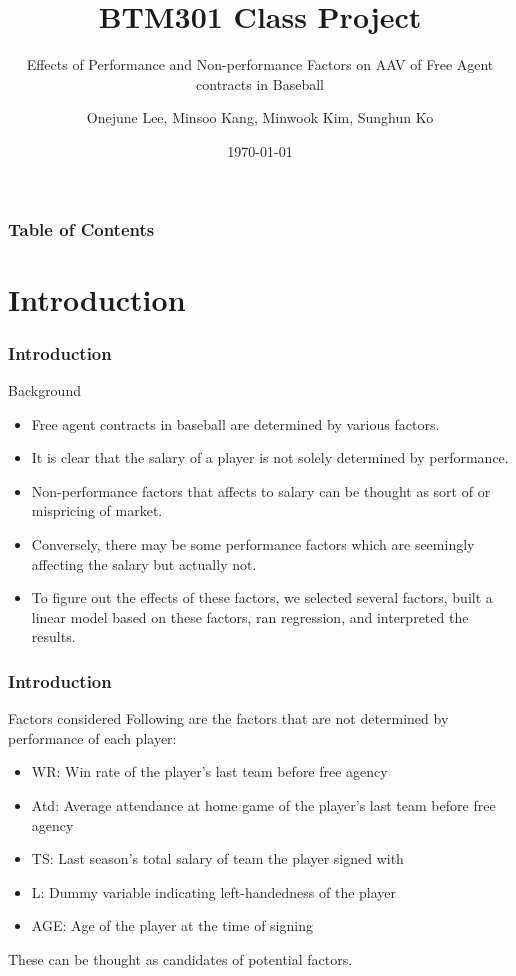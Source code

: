 \documentclass[9pt]{beamer}
\subtitle{Effects of Performance and Non-performance Factors on AAV of Free Agent contracts in Baseball}
\title{BTM301 Class Project}
\author[Team 1]{
    Onejune Lee,
    Minsoo Kang,
    Minwook Kim,
    Sunghun Ko
}
\institute{KAIST}
\date{\today}
\begin{document}
\begin{frame}
    \titlepage
\end{frame}
\begin{frame}
    \frametitle{Table of Contents}
    \tableofcontents
\end{frame}

\section{Introduction}
\begin{frame}
    \frametitle{Introduction}
    \begin{block}{Background}
        \begin{itemize}
            \item Free agent contracts in baseball are determined by various factors.
            \item It is clear that the salary of a player is not solely determined by performance.
            \item Non-performance factors that affects to salary can be thought as sort of  or mispricing of market.
            \item Conversely, there may be some performance factors which are seemingly affecting the salary but actually not.
            \item To figure out the effects of these factors, we selected several factors, built a linear model based on these factors, ran regression, and interpreted the results.
        \end{itemize}
    \end{block}
\end{frame}
\begin{frame}
    \frametitle{Introduction}
    \begin{block}{Factors considered}
        Following are the factors that are not determined by performance of each player:
        \begin{itemize}
            \item WR: Win rate of the player's last team before free agency
            \item Atd: Average attendance at home game of the player's last team before free agency
            \item TS: Last season's total salary of team the player signed with
            \item L: Dummy variable indicating left-handedness of the player
            \item AGE: Age of the player at the time of signing
        \end{itemize}
        These can be thought as candidates of potential  factors.
    \end{block}
\end{frame}
\end{document}
